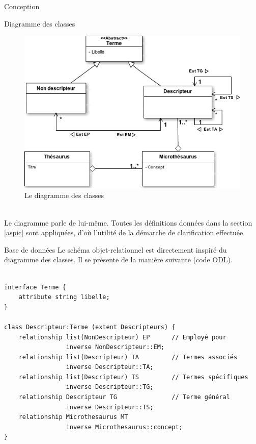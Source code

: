 \documentclass[a4paper, 12pt]{report}
\begin{document}
\begin{chapter}{Conception}
\label{tournevis}
	\begin{section}{Diagramme des classes}
		\begin{figure}[h]
			\label{classeur}
			\begin{center}
				\includegraphics[width=13cm]{Classes.png}
				\caption{Le diagramme des classes}
			\end{center}
		\end{figure}~\\
		
		Le diagramme parle de lui-même. Toutes les définitions données dans la section \ref{aspic} sont appliquées, d'où l'utilité de la démarche de clarification effectuée.\\
	\end{section}
\newpage
	\begin{section}{Base de données}
	Le schéma objet-relationnel est directement inspiré du diagramme des classes. Il se présente de la manière suivante (code ODL).\\~\\
	\begin{verbatim}
interface Terme {
	attribute string libelle;
}

class Descripteur:Terme (extent Descripteurs) {
	relationship list(NonDescripteur) EP      // Employé pour
	             inverse NonDescripteur::EM;
	relationship list(Descripteur) TA         // Termes associés
	             inverse Descripteur::TA;
	relationship list(Descripteur) TS         // Termes spécifiques
	             inverse Descripteur::TG;
	relationship Descripteur TG               // Terme général
	             inverse Descripteur::TS;
	relationship Microthesaurus MT
	             inverse Microthesaurus::concept;
}


\end{verbatim}
\end{section}
\end{chapter}
\end{document}
